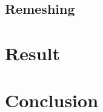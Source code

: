 \documentclass[aspectratio=169]{beamer}
\begin{document}
    \subsection{Remeshing}
\section{Result}
\section*{Conclusion}














\end{document}
